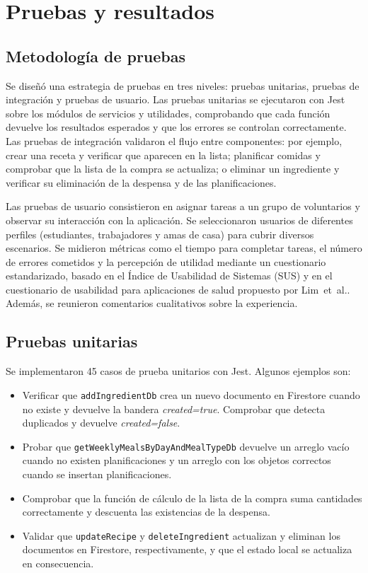 \documentclass[twoside, openright, 11pt]{report}
\begin{document}
\chapter{Pruebas y resultados}
\label{cap.pruebas}

\section{Metodología de pruebas}
Se diseñó una estrategia de pruebas en tres niveles: pruebas unitarias, pruebas de integración y pruebas de usuario. Las pruebas unitarias se ejecutaron con Jest sobre los módulos de servicios y utilidades, comprobando que cada función devuelve los resultados esperados y que los errores se controlan correctamente. Las pruebas de integración validaron el flujo entre componentes: por ejemplo, crear una receta y verificar que aparecen en la lista; planificar comidas y comprobar que la lista de la compra se actualiza; o eliminar un ingrediente y verificar su eliminación de la despensa y de las planificaciones.

Las pruebas de usuario consistieron en asignar tareas a un grupo de voluntarios y observar su interacción con la aplicación. Se seleccionaron usuarios de diferentes perfiles (estudiantes, trabajadores y amas de casa) para cubrir diversos escenarios. Se midieron métricas como el tiempo para completar tareas, el número de errores cometidos y la percepción de utilidad mediante un cuestionario estandarizado, basado en el Índice de Usabilidad de Sistemas (SUS) y en el cuestionario de usabilidad para aplicaciones de salud propuesto por Lim et al.\cite{Lim2025CuestionarioUsabilidad}. Además, se reunieron comentarios cualitativos sobre la experiencia.

\section{Pruebas unitarias}
Se implementaron 45 casos de prueba unitarios con Jest. Algunos ejemplos son:

\begin{itemize}
  \item Verificar que \texttt{addIngredientDb} crea un nuevo documento en Firestore cuando no existe y devuelve la bandera \emph{created=true}. Comprobar que detecta duplicados y devuelve \emph{created=false}.
  \item Probar que \texttt{getWeeklyMealsByDayAndMealTypeDb} devuelve un arreglo vacío cuando no existen planificaciones y un arreglo con los objetos correctos cuando se insertan planificaciones.
  \item Comprobar que la función de cálculo de la lista de la compra suma cantidades correctamente y descuenta las existencias de la despensa.
  \item Validar que \texttt{updateRecipe} y \texttt{deleteIngredient} actualizan y eliminan los documentos en Firestore, respectivamente, y que el estado local se actualiza en consecuencia.
\end{itemize}
\end{document}
